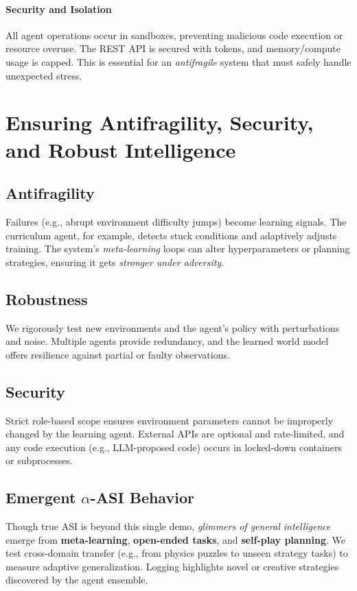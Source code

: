 \documentclass{article}
\begin{document}
\paragraph{Security and Isolation}
All agent operations occur in sandboxes, preventing malicious code execution or resource overuse. The REST API is secured with tokens, and memory/compute usage is capped. This is essential for an \emph{antifragile} system that must safely handle unexpected stress.

\section{Ensuring Antifragility, Security, and Robust Intelligence}

\subsection{Antifragility}
Failures (e.g., abrupt environment difficulty jumps) become learning signals. The curriculum agent, for example, detects stuck conditions and adaptively adjusts training. The system’s \emph{meta-learning} loops can alter hyperparameters or planning strategies, ensuring it gets \emph{stronger under adversity}.

\subsection{Robustness}
We rigorously test new environments and the agent’s policy with perturbations and noise. Multiple agents provide redundancy, and the learned world model offers resilience against partial or faulty observations.

\subsection{Security}
Strict role-based scope ensures environment parameters cannot be improperly changed by the learning agent. External APIs are optional and rate-limited, and any code execution (e.g., LLM-proposed code) occurs in locked-down containers or subprocesses.

\subsection{Emergent \boldmath$\alpha$-ASI Behavior}
Though true ASI is beyond this single demo, \emph{glimmers of general intelligence} emerge from \textbf{meta-learning}, \textbf{open-ended tasks}, and \textbf{self-play planning}. We test cross-domain transfer (e.g., from physics puzzles to unseen strategy tasks) to measure adaptive generalization. Logging highlights novel or creative strategies discovered by the agent ensemble.
\end{document}
